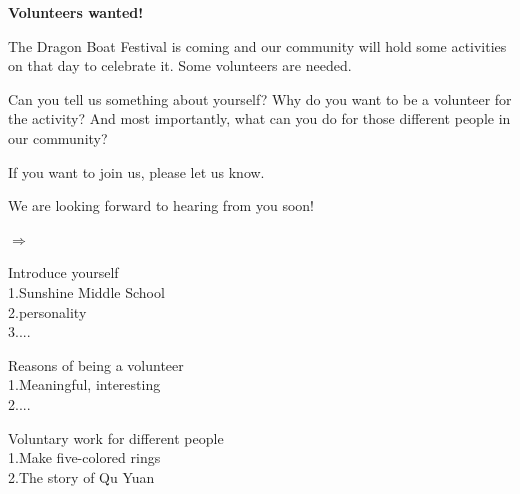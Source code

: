 \documentclass{ExamJHSEngl}
\begin{document}
\begin{minipage}[]{0.5\linewidth}
  \begin{framed}
\textbf{Volunteers wanted!}

The Dragon Boat Festival is coming and our community will hold some activities on that day to celebrate it. Some volunteers are needed.

Can you tell us something about yourself? Why do you want to be a volunteer for the activity? And most importantly, what can you do for those different people in our community?

If you want to join us, please let us know.

We are looking forward to hearing from you soon!

  \end{framed}
\end{minipage}
\begin{minipage}[]{0.05\linewidth}
$\Rightarrow$
\end{minipage}
\begin{minipage}[]{0.4\linewidth}
  \begin{framed}
Introduce yourself\\
1.Sunshine Middle School\\
2.personality\\
3....
  \end{framed}
  \begin{framed}
Reasons of being a volunteer\\
1.Meaningful, interesting\\
2....
  \end{framed}
  \begin{framed}
Voluntary work for different people\\
1.Make five-colored rings\\
2.The story of Qu Yuan
  \end{framed}
\end{minipage}


\ifshowAnswer






\else

\begin{spacing}{1.5}
\end{spacing}

\fi
\end{document}
